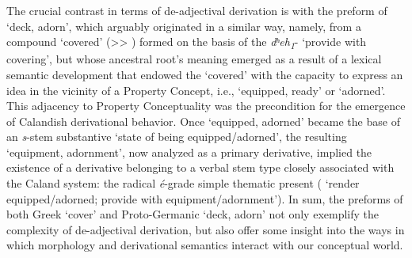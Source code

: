 \documentclass[output=paper,colorlinks,citecolor=brown]{langscibook}
\begin{document}
The crucial contrast in terms of de-adjectival derivation is with the preform of  ‘deck, adorn’, which arguably originated in a similar way, namely, from a compound  ‘covered’ ({>}{>} ) formed on the basis of the    \textit{dʰeh\textsubscript{1}}- ‘provide with covering’, but whose ancestral root’s meaning emerged as a result of a lexical semantic development that endowed the    ‘covered’ with the capacity to express an idea in the vicinity of a Property Concept, i.e., ‘equipped, ready’ or ‘adorned’. This adjacency to Property Conceptuality was the precondition for the emergence of Calandish derivational behavior.  Once \mbox{} ‘equipped, adorned’ became the base of an \textit{s}-stem substantive   ‘state of being equipped/adorned’, the resulting  ‘equipment, adornment’, now analyzed as a primary derivative, implied the existence of a derivative belonging to a verbal stem type closely associated with the Caland system:  the radical \textit{é}-grade simple thematic present ( ‘render equipped/adorned; provide with equipment/adornment’). In sum, the preforms of both Greek  ‘cover’ and Proto-Germanic  ‘deck, adorn’ not only exemplify the complexity of de-adjectival derivation, but also offer some insight into the ways in which morphology and derivational semantics interact with our conceptual world.
\end{document}
